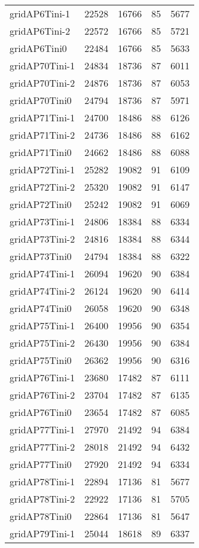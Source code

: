 \begin{longtable}{lrrrr}
gridAP6Tini-1 & 22528 & 16766 & 85 & 5677 \\
gridAP6Tini-2 & 22572 & 16766 & 85 & 5721 \\
gridAP6Tini0 & 22484 & 16766 & 85 & 5633 \\
gridAP70Tini-1 & 24834 & 18736 & 87 & 6011 \\
gridAP70Tini-2 & 24876 & 18736 & 87 & 6053 \\
gridAP70Tini0 & 24794 & 18736 & 87 & 5971 \\
gridAP71Tini-1 & 24700 & 18486 & 88 & 6126 \\
gridAP71Tini-2 & 24736 & 18486 & 88 & 6162 \\
gridAP71Tini0 & 24662 & 18486 & 88 & 6088 \\
gridAP72Tini-1 & 25282 & 19082 & 91 & 6109 \\
gridAP72Tini-2 & 25320 & 19082 & 91 & 6147 \\
gridAP72Tini0 & 25242 & 19082 & 91 & 6069 \\
gridAP73Tini-1 & 24806 & 18384 & 88 & 6334 \\
gridAP73Tini-2 & 24816 & 18384 & 88 & 6344 \\
gridAP73Tini0 & 24794 & 18384 & 88 & 6322 \\
gridAP74Tini-1 & 26094 & 19620 & 90 & 6384 \\
gridAP74Tini-2 & 26124 & 19620 & 90 & 6414 \\
gridAP74Tini0 & 26058 & 19620 & 90 & 6348 \\
gridAP75Tini-1 & 26400 & 19956 & 90 & 6354 \\
gridAP75Tini-2 & 26430 & 19956 & 90 & 6384 \\
gridAP75Tini0 & 26362 & 19956 & 90 & 6316 \\
gridAP76Tini-1 & 23680 & 17482 & 87 & 6111 \\
gridAP76Tini-2 & 23704 & 17482 & 87 & 6135 \\
gridAP76Tini0 & 23654 & 17482 & 87 & 6085 \\
gridAP77Tini-1 & 27970 & 21492 & 94 & 6384 \\
gridAP77Tini-2 & 28018 & 21492 & 94 & 6432 \\
gridAP77Tini0 & 27920 & 21492 & 94 & 6334 \\
gridAP78Tini-1 & 22894 & 17136 & 81 & 5677 \\
gridAP78Tini-2 & 22922 & 17136 & 81 & 5705 \\
gridAP78Tini0 & 22864 & 17136 & 81 & 5647 \\
gridAP79Tini-1 & 25044 & 18618 & 89 & 6337 \\

\end{longtable}
